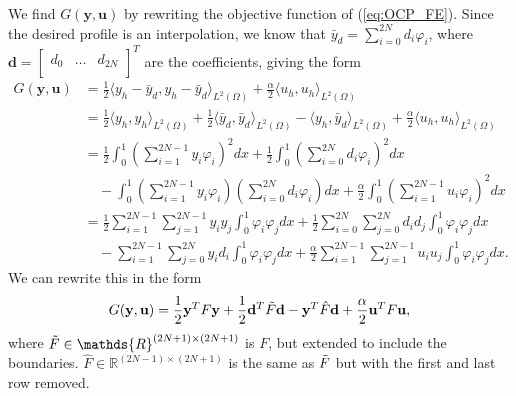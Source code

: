 We find $G(\mathbf{y, u})$ by rewriting the objective function of (\ref{eq:OCP_FE}).
Since the desired profile is an interpolation, we know that $\bar{y}_d = \sum_{i=0}^{2N}d_i\varphi_i$,
where $\mathbf{d} = \begin{bmatrix} d_0 & \dots & d_{2N} \\ \end{bmatrix}^T$
are the coefficients,
giving the form
\begin{align*}
    G(\mathbf{y, u}) &= \frac{1}{2}\langle y_h - \bar{y}_d, y_h - \bar{y}_d \rangle_{L^2{(\Omega)}} + \frac{\alpha}{2} \langle u_h, u_h \rangle_{L^2(\Omega)} \\
   &= \frac{1}{2}\langle y_h , y_h \rangle_{L^2{(\Omega)}} +  \frac{1}{2}\langle \bar{y}_d ,\bar{y}_d  \rangle_{L^2{(\Omega)}}
   - \langle y_h, \bar{y}_d \rangle_{L^2{(\Omega)}} + \frac{\alpha}{2} \langle u_h, u_h \rangle_{L^2(\Omega)} \\
     &= \frac{1}{2}\int_0^1\left( \sum_{i=1}^{2N-1}y_i \varphi_i \right)^2dx  + \frac{1}{2}\int_0^1\left( \sum_{i=0}^{2N}d_i \varphi_i \right)^2dx \\
     &\quad- \int_0^1\left( \sum_{i=1}^{2N-1}y_i \varphi_i \right) \left(\sum_{i=0}^{2N} d_i \varphi_i \right)dx + 
     \frac{\alpha}{2}\int_0^1\left(\sum_{i=1}^{2N-1} u_i \varphi_i  \right)^2dx \\    
     &= \frac{1}{2}\sum_{i=1}^{2N-1}\sum_{j=1}^{2N-1} y_i y_j \int_0^1 \varphi_i \varphi_j dx + \frac{1}{2}\sum_{i=0}^{2N}\sum_{j=0}^{2N} d_i d_j \int_0^1 \varphi_i \varphi_j dx \\
    &\quad- \sum_{i=1}^{2N-1} \sum_{j=0}^{2N} y_i d_i \int_0^1 \varphi_i \varphi_j dx +  \frac{\alpha}{2}\sum_{i=1}^{2N-1}\sum_{j=1}^{2N-1} u_i u_j \int_0^1\varphi_i \varphi_j dx.
\end{align*}
We can rewrite this in the form
$$
G(\mathbf{y, u}) = \frac{1}{2}\mathbf{y}^T F \mathbf{y} + \frac{1}{2}\mathbf{d}^T\Tilde{F} \mathbf{d} - \mathbf{y}^T\hat{F}\mathbf{d} + \frac{\alpha}{2}\mathbf{u}^T F \mathbf{u},
$$
where $\Tilde{F} \in \mathds{R}^{(2N+1) \times (2N+1)}$
is $F$, but extended to include the boundaries.
$\hat{F} \in \mathds{R}^{(2N-1) \times (2N+1)}$ is the same as $\Tilde{F}$ but with the first and last row removed.  

